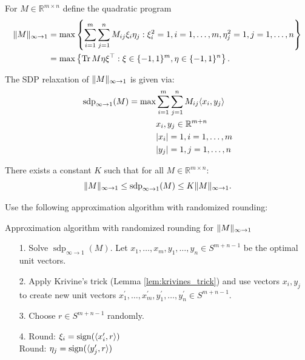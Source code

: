 	\begin{frame}
		\begin{dfn}
			For $M\in\mathbb{R}^{m\times n}$ define the quadratic program
			\begin{align}
				 \Vert {M} \Vert_{\infty\to 1} &= \max \left\{ \sum_{i=1}^m \sum_{j=1}^n M_{ij} \xi_i \eta_j : \xi_i^2=1, i=1,\dots,m, \eta_j^2=1, j =1,\dots,n \right\}  \nonumber\\
				&=\max\left\{\textup{Tr} \, {M \eta\xi^\top } : \xi\in\{-1,1\}^m,\eta\in\{-1,1\}^n\right\}.
			\end{align}
		\end{dfn}
		\begin{dfn} The SDP relaxation of $ \Vert {M} \Vert_{\infty\to1}$ is given via:
			\begin{align*}
				\operatorname{sdp}_{\infty\to 1} (M) = \max 
				&\sum_{i=1}^m\sum_{j=1}^n M_{ij} \langle{x_i},{y_j}\rangle\\
				&x_i,y_j\in\mathbb{R}^{m+n}\\
				&{\left|{x_i}\right|}=1, i=1,\dots,m\\
				&{\left|{y_j}\right|}=1, j=1,\dots,n
			\end{align*}
		\end{dfn}
	\end{frame}
	\begin{frame}
		\begin{theo} \label{theo:G_ineq}
			There exists a constant $K$ such that for all $M\in\mathbb{R}^{m\times n}$:
			\begin{equation}
				 \Vert {M} \Vert_{\infty\to 1} \leq \operatorname{sdp}_{\infty\to 1} (M) \leq K  \Vert {M} \Vert_{\infty\to 1}.
			\end{equation}
		\end{theo}
		\begin{pbmr}
			Use the following approximation algorithm with randomized rounding:
			\begin{algorithm}[H]
				\SetAlgoLined
				\caption{Approximation algorithm with randomized rounding for $ \Vert {M} \Vert_{\infty\to 1}$}
			\end{algorithm}
			\begin{itemize}
				\item[1.] Solve $\operatorname{sdp}_{\infty\to 1} (M)$. Let $x_1,\dots,x_m,y_1,\dots,y_n\in S^{m+n-1}$ be the optimal unit vectors.
				\item[2.] Apply Krivine's trick (Lemma \ref{lem:krivines_trick}) and use vectors $x_i,y_j$ to create new unit vectors $x_1^\prime,\dots,x_m^\prime, y_1^\prime,\dots,y_n^\prime\in S^{m+n-1}$.
				\item[3.] Choose $r\in S^{m+n-1}$ randomly.
				\item[4.] Round: $\xi_i = \operatorname{sign}(\langle{x_i^\prime},{r}\rangle)$\\
							\textcolor{blue!8}{Round: }$\eta_j = \operatorname{sign}(\langle{y_j^\prime},{r}\rangle)$
			\end{itemize}
		\end{pbmr}
	\end{frame}
